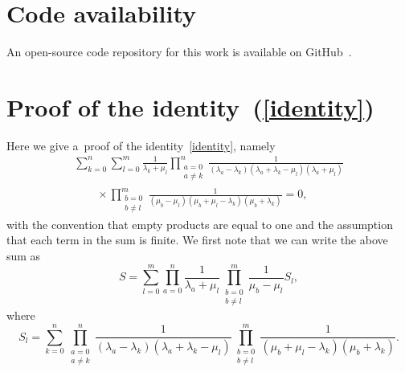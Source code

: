 \documentclass[pdftex]{sigma}
\theoremstyle{definition}
\begin{document}
\section*{Code availability}

An open-source code repository for this work is available on GitHub~\cite{noc-gh}.

\appendix

\section{Proof of the identity~(\ref{identity})}\label{AA}

Here we give a~proof of the identity~\eqref{identity}, namely
\begin{gather*}
\sum_{k=0}^n \sum_{l=0}^m
 \frac1{\lambda_k+\mu_l}
 \prod_{\substack{a=0\\ a\ne k}}^{n} \frac{1}{(\lambda_a-\lambda_k)(\lambda_a+\lambda_k-\mu_l)(\lambda_a+\mu_l)} \\
\qquad \times \prod_{\substack{b=0\\ b\ne l}}^{m} \frac1{(\mu_b-\mu_l)(\mu_b+\mu_l-\lambda_k)(\mu_b+\lambda_k)} =0,
\end{gather*}
with the convention that empty products are equal to one and the assumption that
each term in the sum is finite.
We first note that we can write the above sum as
\begin{equation}\label{sum}
S = \sum_{l=0}^m \prod_{a=0}^n\frac1{\lambda_a+\mu_l} \prod_{\substack{b=0\\ b\ne l}}^{m} \frac1{\mu_b-\mu_l} S_l,
\end{equation}
where
\[S_l=\sum_{k=0}^n \prod_{\substack{a=0\\ a\ne k}}^{n} \frac{1}{(\lambda_a-\lambda_k)(\lambda_a+\lambda_k-\mu_l)}
\prod_{\substack{b=0\\ b\ne l}}^{m} \frac1{(\mu_b+\mu_l-\lambda_k)(\mu_b+\lambda_k)}.\]
\end{document}
